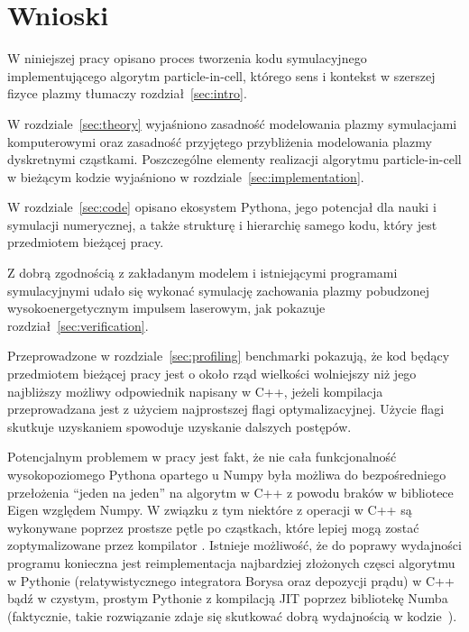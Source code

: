 \section[Wnioski]{Wnioski}\label{sec:ending} %

W niniejszej pracy opisano proces tworzenia kodu symulacyjnego implementującego
algorytm particle-in-cell, którego sens i kontekst w szerszej fizyce plazmy tłumaczy rozdział~\ref{sec:intro}.

W rozdziale~\ref{sec:theory} wyjaśniono zasadność modelowania plazmy symulacjami komputerowymi oraz zasadność przyjętego przybliżenia
modelowania plazmy dyskretnymi cząstkami. Poszczególne elementy realizacji algorytmu particle-in-cell w bieżącym kodzie wyjaśniono w rozdziale~\ref{sec:implementation}.

W rozdziale~\ref{sec:code} opisano ekosystem Pythona, jego potencjał dla nauki i symulacji numerycznej, a także strukturę i hierarchię samego kodu, który jest przedmiotem bieżącej pracy.

Z dobrą zgodnością z zakładanym modelem i istniejącymi programami symulacyjnymi udało się wykonać symulację zachowania plazmy pobudzonej wysokoenergetycznym impulsem laserowym, jak pokazuje rozdział~\ref{sec:verification}.

Przeprowadzone w rozdziale~\ref{sec:profiling} benchmarki pokazują, że kod będący przedmiotem bieżącej pracy jest o około rząd wielkości wolniejszy niż jego najbliższy możliwy odpowiednik
napisany w C++, jeżeli kompilacja przeprowadzana jest z użyciem najprostszej flagi optymalizacyjnej. Użycie flagi  skutkuje uzyskaniem spowoduje uzyskanie dalszych postępów.

Potencjalnym problemem w pracy jest fakt, że nie cała funkcjonalność wysokopoziomego Pythona opartego u Numpy była możliwa do bezpośredniego przełożenia ``jeden na jeden'' na algorytm
w C++ z powodu braków w bibliotece Eigen względem Numpy. W związku z tym niektóre z operacji w C++ są wykonywane poprzez prostsze pętle po cząstkach, które lepiej mogą zostać zoptymalizowane
przez kompilator . Istnieje możliwość, że do poprawy wydajności programu konieczna jest reimplementacja najbardziej złożonych częsci algorytmu w Pythonie (relatywistycznego integratora Borysa oraz depozycji prądu) w C++
bądź w czystym, prostym Pythonie z kompilacją JIT poprzez bibliotekę Numba (faktycznie, takie rozwiązanie zdaje się skutkować dobrą wydajnością w kodzie~\cite{fbpic}).

